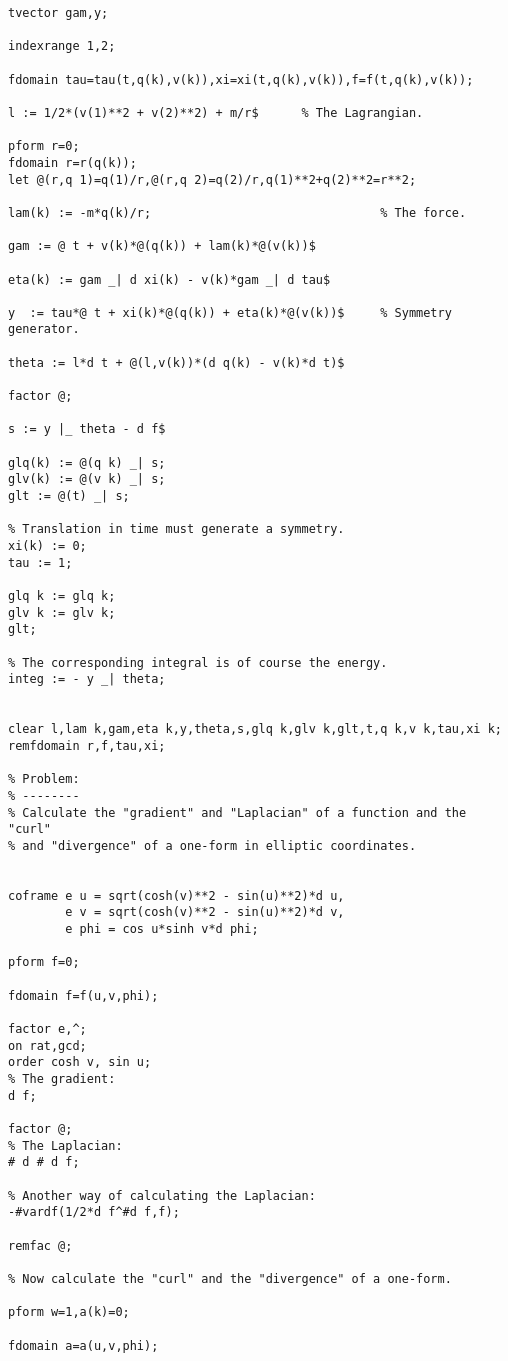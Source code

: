 {\begin{verbatim}
tvector gam,y;

indexrange 1,2;

fdomain tau=tau(t,q(k),v(k)),xi=xi(t,q(k),v(k)),f=f(t,q(k),v(k));

l := 1/2*(v(1)**2 + v(2)**2) + m/r$      % The Lagrangian.

pform r=0;
fdomain r=r(q(k));
let @(r,q 1)=q(1)/r,@(r,q 2)=q(2)/r,q(1)**2+q(2)**2=r**2;

lam(k) := -m*q(k)/r;                                % The force.

gam := @ t + v(k)*@(q(k)) + lam(k)*@(v(k))$

eta(k) := gam _| d xi(k) - v(k)*gam _| d tau$

y  := tau*@ t + xi(k)*@(q(k)) + eta(k)*@(v(k))$     % Symmetry generator.

theta := l*d t + @(l,v(k))*(d q(k) - v(k)*d t)$

factor @;

s := y |_ theta - d f$

glq(k) := @(q k) _| s;
glv(k) := @(v k) _| s;
glt := @(t) _| s;

% Translation in time must generate a symmetry.
xi(k) := 0;
tau := 1;

glq k := glq k;
glv k := glv k;
glt;

% The corresponding integral is of course the energy.
integ := - y _| theta;


clear l,lam k,gam,eta k,y,theta,s,glq k,glv k,glt,t,q k,v k,tau,xi k;
remfdomain r,f,tau,xi;

% Problem:
% --------
% Calculate the "gradient" and "Laplacian" of a function and the "curl"
% and "divergence" of a one-form in elliptic coordinates.


coframe e u = sqrt(cosh(v)**2 - sin(u)**2)*d u,
        e v = sqrt(cosh(v)**2 - sin(u)**2)*d v,
        e phi = cos u*sinh v*d phi;

pform f=0;

fdomain f=f(u,v,phi);

factor e,^;
on rat,gcd;
order cosh v, sin u;
% The gradient:
d f;

factor @;
% The Laplacian:
# d # d f;

% Another way of calculating the Laplacian:
-#vardf(1/2*d f^#d f,f);

remfac @;

% Now calculate the "curl" and the "divergence" of a one-form.

pform w=1,a(k)=0;

fdomain a=a(u,v,phi);


\end{verbatim}}
